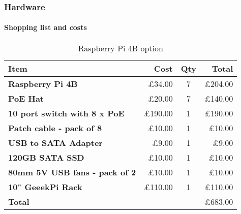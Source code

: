 \begin{frame}
	\frametitle{Hardware}
	\framesubtitle{Shopping list and costs}
	\begin{table}[]
		\begin{tabular}{l|rcr}
			\hline
			\textbf{Item} & \textbf{Cost} & \textbf{Qty} & \textbf{Total} \\ \hline
			\textbf{Raspberry Pi 4B} & £34.00 & 7 & £204.00\\ 
			\textbf{PoE Hat} & £20.00 & 7 & £140.00\\ 
			\textbf{10 port switch with 8 x PoE} & £190.00 & 1 & £190.00\\
			\textbf{Patch cable - pack of 8} & £10.00 & 1 & £10.00\\
			\textbf{USB to SATA Adapter} & £9.00 & 1 & £9.00\\
			\textbf{120GB SATA SSD} & £10.00 & 1 & £10.00\\
			\textbf{80mm 5V USB fans - pack of 2} & £10.00 & 1 & £10.00\\
			\textbf{10" GeeekPi Rack} & £110.00 & 1 & £110.00\\
			
			\hline
			\textbf{Total} & & & £683.00\\
			\hline
		\end{tabular}
		\caption{Raspberry Pi 4B option}
		\label{tab:1}
	\end{table}
\end{frame}

